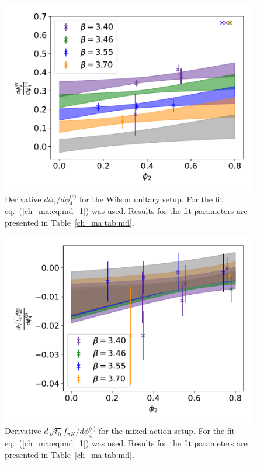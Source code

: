 \begin{figure}
    \centering
    \includegraphics[width=1.\textwidth]{./cap4/figs/dphi2_w.pdf}
    \caption{Derivative $d\phi_2/d\phi_4^{\textrm{(s)}}$ for the Wilson unitary setup. For the fit eq.~(\ref{ch_ma:eq:md_1}) was used. Results for the fit parameters are presented in Table~\ref{ch_ma:tab:md}.}
    \label{ch_ma:fig:dphi2_w}
\end{figure}

\begin{figure}
    \centering
    \includegraphics[width=1.\textwidth]{./cap4/figs/dt0fpik_tm.pdf}
    \caption{Derivative $d\sqrt{t_0}f_{\pi K}/d\phi_4^{\textrm{(s)}}$ for the mixed action setup. For the fit eq.~(\ref{ch_ma:eq:md_1}) was used. Results for the fit parameters are presented in Table~\ref{ch_ma:tab:md}.}
    \label{ch_ma:fig:dfpik_tm}
\end{figure}

